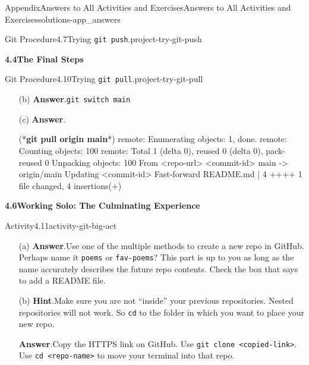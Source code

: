 \documentclass[twoside,10pt,]{book}
\newcommand{\blocktitlefont}{\relax}
\newcommand{\mono}[1]{\texttt{#1}}
\newcommand{\consoleinput}[1]{\textbf{#1}}
\begin{document}
\begin{solutions-chapter}{Appendix}{Answers to All Activities and Exercises}{}{Answers to All Activities and Exercises}{}{}{solutions-app_answers}
\begin{projectsolution}{Git Procedure}{4.7}{Trying \mono{git push}.}{project-try-git-push}
\begin{enumerate}[font=\bfseries,label=(\alph*),ref=\alph*]
\end{enumerate}%
\end{projectsolution}%
\par\medskip
\noindent\textbf{\Large{}4.4\space\textperiodcentered\space{}The Final Steps}
\begin{projectsolution}{Git Procedure}{4.10}{Trying \mono{git pull}.}{project-try-git-pull}%
\begin{enumerate}[font=\bfseries,label=(\alph*),ref=\alph*]%
\item[(b)]\noindent\textbf{\blocktitlefont Answer}.\hypertarget{answer-try-git-pull-f-b-back}{}\quad{}\mono{git switch main}%
\item[(c)]\noindent\textbf{\blocktitlefont Answer}.\hypertarget{answer-try-git-pull-g-b-back}{}\quad{}\begin{console}{0}{1}{0}
(*\consoleinput{git pull origin main}*)
remote: Enumerating objects: 1, done.
remote: Counting objects: 100%
remote: Total 1 (delta 0), reused 0 (delta 0), pack-reused 0
Unpacking objects: 100%
From <repo-url>
   <commit-id>  main       -> origin/main
Updating <commit-id>
Fast-forward
 README.md | 4 ++++
 1 file changed, 4 insertions(+)
\end{console}
\end{enumerate}%
\end{projectsolution}%
\par\medskip
\noindent\textbf{\Large{}4.6\space\textperiodcentered\space{}Working Solo: The Culminating Experience}
\begin{activitysolution}{Activity}{4.11}{}{activity-git-big-act}%
\begin{enumerate}[font=\bfseries,label=(\alph*),ref=\alph*]%
\item[(a)]\noindent\textbf{\blocktitlefont Answer}.\hypertarget{answer-git-ba-newrepo-b-back}{}\quad{}Use one of the multiple methods to create a new repo in GitHub. Perhaps name it \mono{poems} or \mono{fav-poems}? This part is up to you as long as the name accurately describes the future repo contents. Check the box that says to add a README file.%
\item[(b)]\noindent\textbf{\blocktitlefont Hint}.\hypertarget{hint-git-ba-clone-b-back}{}\quad{}Make sure you are not ``inside'' your previous repositories. Nested repositories will not work. So \mono{cd} to the folder in which you want to place your new repo.%
\par\smallskip%
\noindent\textbf{\blocktitlefont Answer}.\hypertarget{answer-git-ba-clone-c-back}{}\quad{}Copy the HTTPS link on GitHub. Use \mono{git clone <copied-link>}. Use \mono{cd <repo-name>} to move your terminal into that repo.%

\end{enumerate}
\end{activitysolution}
\end{solutions-chapter}
\end{document}

